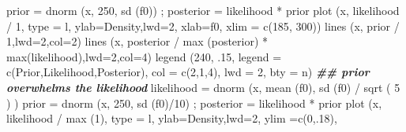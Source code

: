 \documentclass[
]{book}
\newenvironment{Shaded}{\begin{snugshade}}{\end{snugshade}}
\newcommand{\AttributeTok}[1]{\textcolor[rgb]{0.77,0.63,0.00}{#1}}
\newcommand{\DecValTok}[1]{\textcolor[rgb]{0.00,0.00,0.81}{#1}}
\newcommand{\DocumentationTok}[1]{\textcolor[rgb]{0.56,0.35,0.01}{\textbf{\textit{#1}}}}
\newcommand{\FunctionTok}[1]{\textcolor[rgb]{0.00,0.00,0.00}{#1}}
\newcommand{\NormalTok}[1]{#1}
\newcommand{\OtherTok}[1]{\textcolor[rgb]{0.56,0.35,0.01}{#1}}
\newcommand{\SpecialCharTok}[1]{\textcolor[rgb]{0.00,0.00,0.00}{#1}}
\newcommand{\StringTok}[1]{\textcolor[rgb]{0.31,0.60,0.02}{#1}}
\begin{document}
\begin{Shaded}
\begin{Highlighting}[]
\NormalTok{prior }\OtherTok{=} \FunctionTok{dnorm}\NormalTok{ (x, }\DecValTok{250}\NormalTok{, }\FunctionTok{sd}\NormalTok{ (f0)) ; posterior }\OtherTok{=}\NormalTok{ likelihood }\SpecialCharTok{*}\NormalTok{ prior}
\FunctionTok{plot}\NormalTok{ (x, likelihood }\SpecialCharTok{/} \DecValTok{1}\NormalTok{, }\AttributeTok{type =} \StringTok{\textquotesingle{}l\textquotesingle{}}\NormalTok{, }\AttributeTok{ylab=}\StringTok{\textquotesingle{}Density\textquotesingle{}}\NormalTok{,}\AttributeTok{lwd=}\DecValTok{2}\NormalTok{, }\AttributeTok{xlab=}\StringTok{\textquotesingle{}f0\textquotesingle{}}\NormalTok{,}
      \AttributeTok{xlim =} \FunctionTok{c}\NormalTok{(}\DecValTok{185}\NormalTok{, }\DecValTok{300}\NormalTok{))}
\FunctionTok{lines}\NormalTok{ (x, prior }\SpecialCharTok{/} \DecValTok{1}\NormalTok{,}\AttributeTok{lwd=}\DecValTok{2}\NormalTok{,}\AttributeTok{col=}\DecValTok{2}\NormalTok{)}
\FunctionTok{lines}\NormalTok{ (x, posterior }\SpecialCharTok{/} \FunctionTok{max}\NormalTok{ (posterior) }\SpecialCharTok{*} \FunctionTok{max}\NormalTok{(likelihood),}\AttributeTok{lwd=}\DecValTok{2}\NormalTok{,}\AttributeTok{col=}\DecValTok{4}\NormalTok{)}
\FunctionTok{legend}\NormalTok{ (}\DecValTok{240}\NormalTok{, .}\DecValTok{15}\NormalTok{, }\AttributeTok{legend =} \FunctionTok{c}\NormalTok{(}\StringTok{\textquotesingle{}Prior\textquotesingle{}}\NormalTok{,}\StringTok{\textquotesingle{}Likelihood\textquotesingle{}}\NormalTok{,}\StringTok{\textquotesingle{}Posterior\textquotesingle{}}\NormalTok{), }\AttributeTok{col =} \FunctionTok{c}\NormalTok{(}\DecValTok{2}\NormalTok{,}\DecValTok{1}\NormalTok{,}\DecValTok{4}\NormalTok{),}
        \AttributeTok{lwd =} \DecValTok{2}\NormalTok{, }\AttributeTok{bty =} \StringTok{\textquotesingle{}n\textquotesingle{}}\NormalTok{)}
\DocumentationTok{\#\# prior overwhelms the likelihood}
\NormalTok{likelihood }\OtherTok{=} \FunctionTok{dnorm}\NormalTok{ (x, }\FunctionTok{mean}\NormalTok{ (f0), }\FunctionTok{sd}\NormalTok{ (f0) }\SpecialCharTok{/} \FunctionTok{sqrt}\NormalTok{ ( }\DecValTok{5}\NormalTok{ ) )}
\NormalTok{prior }\OtherTok{=} \FunctionTok{dnorm}\NormalTok{ (x, }\DecValTok{250}\NormalTok{, }\FunctionTok{sd}\NormalTok{ (f0)}\SpecialCharTok{/}\DecValTok{10}\NormalTok{) ; posterior }\OtherTok{=}\NormalTok{ likelihood }\SpecialCharTok{*}\NormalTok{ prior}
\FunctionTok{plot}\NormalTok{ (x, likelihood }\SpecialCharTok{/} \FunctionTok{max}\NormalTok{ (}\DecValTok{1}\NormalTok{), }\AttributeTok{type =} \StringTok{\textquotesingle{}l\textquotesingle{}}\NormalTok{, }\AttributeTok{ylab=}\StringTok{\textquotesingle{}Density\textquotesingle{}}\NormalTok{,}\AttributeTok{lwd=}\DecValTok{2}\NormalTok{, }\AttributeTok{ylim =}\FunctionTok{c}\NormalTok{(}\DecValTok{0}\NormalTok{,.}\DecValTok{18}\NormalTok{),}

\end{Highlighting}
\end{Shaded}
\end{document}

